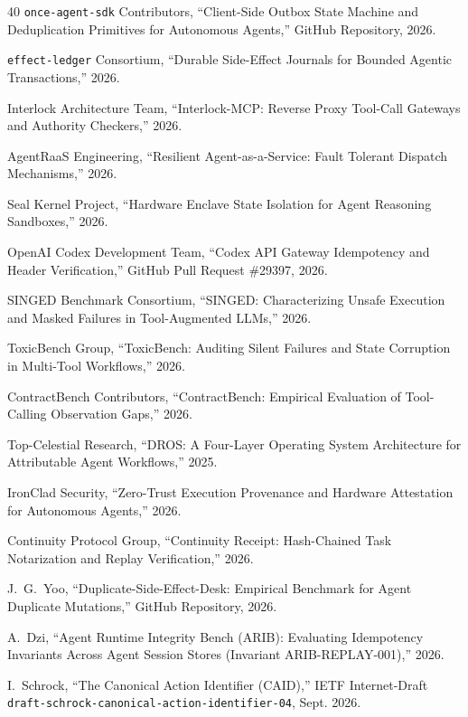 \documentclass[10pt,journal,compsoc]{IEEEtran}
\begin{document}
\begin{thebibliography}{40}
\texttt{once-agent-sdk} Contributors, ``Client-Side Outbox State Machine and Deduplication Primitives for Autonomous Agents,'' GitHub Repository, 2026.

\texttt{effect-ledger} Consortium, ``Durable Side-Effect Journals for Bounded Agentic Transactions,'' 2026.

Interlock Architecture Team, ``Interlock-MCP: Reverse Proxy Tool-Call Gateways and Authority Checkers,'' 2026.

AgentRaaS Engineering, ``Resilient Agent-as-a-Service: Fault Tolerant Dispatch Mechanisms,'' 2026.

Seal Kernel Project, ``Hardware Enclave State Isolation for Agent Reasoning Sandboxes,'' 2026.

OpenAI Codex Development Team, ``Codex API Gateway Idempotency and Header Verification,'' GitHub Pull Request \#29397, 2026.

SINGED Benchmark Consortium, ``SINGED: Characterizing Unsafe Execution and Masked Failures in Tool-Augmented LLMs,'' 2026.

ToxicBench Group, ``ToxicBench: Auditing Silent Failures and State Corruption in Multi-Tool Workflows,'' 2026.

ContractBench Contributors, ``ContractBench: Empirical Evaluation of Tool-Calling Observation Gaps,'' 2026.

Top-Celestial Research, ``DROS: A Four-Layer Operating System Architecture for Attributable Agent Workflows,'' 2025.

IronClad Security, ``Zero-Trust Execution Provenance and Hardware Attestation for Autonomous Agents,'' 2026.

Continuity Protocol Group, ``Continuity Receipt: Hash-Chained Task Notarization and Replay Verification,'' 2026.

J.~G.~Yoo, ``Duplicate-Side-Effect-Desk: Empirical Benchmark for Agent Duplicate Mutations,'' GitHub Repository, 2026.

A.~Dzi, ``Agent Runtime Integrity Bench (ARIB): Evaluating Idempotency Invariants Across Agent Session Stores (Invariant ARIB-REPLAY-001),'' 2026.

I.~Schrock, ``The Canonical Action Identifier (CAID),'' IETF Internet-Draft \texttt{draft-schrock-canonical-action-identifier-04}, Sept. 2026.


\end{thebibliography}
\end{document}
